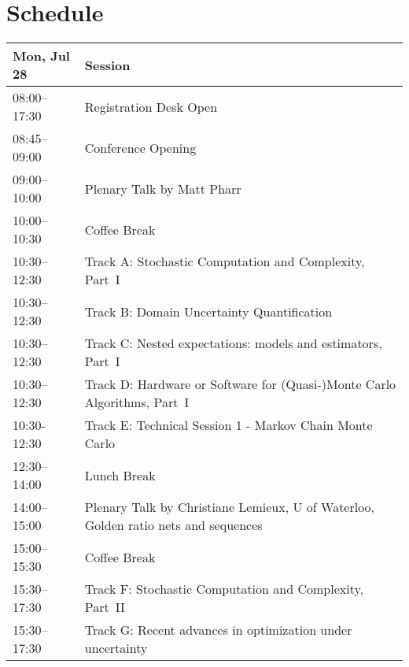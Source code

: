 \chapter{Schedule}
\begin{table}
{\footnotesize
\begin{tabularx}{\textwidth}{>{\hsize=0.32\hsize}X|>{\hsize=1.7\hsize}X}
\hline
\textbf{Mon, Jul 28} & \textbf{Session} \\
\hline
\cellcolor{\EmptyColor}08:00–17:30 & \cellcolor{\EmptyColor}Registration Desk Open \\
\cellcolor{\PlenaryColor}08:45–09:00 & \cellcolor{\PlenaryColor}Conference Opening \\
\cellcolor{\PlenaryColor}09:00–10:00 & \cellcolor{\PlenaryColor}Plenary Talk by Matt Pharr \\
\cellcolor{\EmptyColor}10:00–10:30 & \cellcolor{\EmptyColor}Coffee Break \\
\cellcolor{\SessionTitleColor}10:30–12:30 & \cellcolor{\SessionTitleColor}Track A: Stochastic Computation and Complexity, Part~I \\
\cellcolor{\SessionTitleColor}10:30–12:30 & \cellcolor{\SessionTitleColor}Track B: Domain Uncertainty Quantification \\
\cellcolor{\SessionTitleColor}10:30–12:30 & \cellcolor{\SessionTitleColor}Track C: Nested expectations: models and estimators, Part~I \\
\cellcolor{\SessionTitleColor}10:30–12:30 & \cellcolor{\SessionTitleColor}Track D: Hardware or Software for (Quasi-)Monte Carlo Algorithms, Part~I \\
\cellcolor{\SessionLightColor}10:30-12:30 & \cellcolor{\SessionLightColor}Track E: Technical Session 1 - Markov Chain Monte Carlo \\
\cellcolor{\EmptyColor}12:30–14:00 & \cellcolor{\EmptyColor}Lunch Break \\
\cellcolor{\PlenaryColor}14:00–15:00 & \cellcolor{\PlenaryColor}Plenary Talk by Christiane Lemieux, U of Waterloo, Golden ratio nets and sequences \\
\cellcolor{\EmptyColor}15:00–15:30 & \cellcolor{\EmptyColor}Coffee Break \\
\cellcolor{\SessionTitleColor}15:30–17:30 & \cellcolor{\SessionTitleColor}Track F: Stochastic Computation and Complexity, Part~II \\
\cellcolor{\SessionTitleColor}15:30–17:30 & \cellcolor{\SessionTitleColor}Track G: Recent advances in optimization under uncertainty \\

\end{tabularx}}
\end{table}
